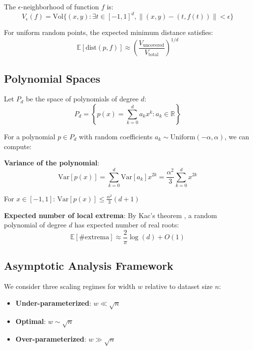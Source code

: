 \begin{definition}
The $\epsilon$-neighborhood of function $f$ is:
$$V_\epsilon(f) = \text{Vol}\{(x, y) : \exists t \in [-1,1]^d, \|(x, y) - (t, f(t))\| < \epsilon\}$$
\end{definition}

\begin{definition}
For uniform random points, the expected minimum distance satisfies:
$$\mathbb{E}[\text{dist}(p, f)] \approx \left(\frac{V_{\text{uncovered}}}{V_{\text{total}}}\right)^{1/d}$$
\end{definition}

\subsection{Polynomial Spaces}

Let $P_d$ be the space of polynomials of degree $d$:
$$P_d = \left\{p(x) = \sum_{k=0}^d a_k x^k : a_k \in \mathbb{R}\right\}$$

For a polynomial $p \in P_d$ with random coefficients $a_k \sim \text{Uniform}(-\alpha, \alpha)$, we can compute:

\textbf{Variance of the polynomial}:
$$\text{Var}[p(x)] = \sum_{k=0}^d \text{Var}[a_k] x^{2k} = \frac{\alpha^2}{3} \sum_{k=0}^d x^{2k}$$

For $x \in [-1, 1]$: $\text{Var}[p(x)] \leq \frac{\alpha^2}{3}(d + 1)$

\textbf{Expected number of local extrema}:
By Kac's theorem \cite{kac1943average}, a random polynomial of degree $d$ has expected number of real roots:
$$\mathbb{E}[\#\text{extrema}] \approx \frac{2}{\pi} \log(d) + O(1)$$

\subsection{Asymptotic Analysis Framework}

\begin{definition}
We consider three scaling regimes for width $w$ relative to dataset size $n$:
\begin{itemize}
    \item \textbf{Under-parameterized}: $w \ll \sqrt{n}$
    \item \textbf{Optimal}: $w \sim \sqrt{n}$
    \item \textbf{Over-parameterized}: $w \gg \sqrt{n}$
\end{itemize}
\end{definition}

